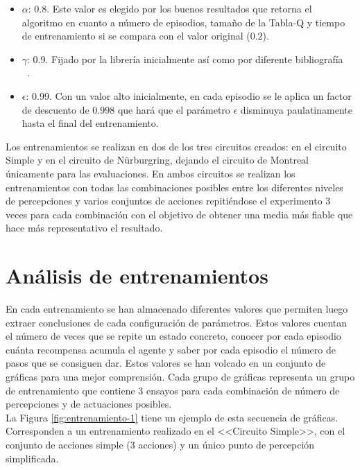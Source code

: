 \begin{itemize}
    \item \textbf{$\alpha$}: 0.8. Este valor es elegido por los buenos resultados que retorna el algoritmo en cuanto a número de episodios, tamaño de la Tabla-Q y tiempo de entrenamiento si se compara con el valor original ($0.2$).
    \item \textbf{$\gamma$}: 0.9. Fijado por la librería inicialmente así como por diferente bibliografía~\cite{oreily} ~\cite{pytorch_drl}.
    \item \textbf{$\epsilon$}: 0.99. Con un valor alto inicialmente, en cada episodio se le aplica un factor de descuento de $0.998$ que hará que el parámetro $\epsilon$ disminuya paulatinamente hasta el final del entrenamiento.\\
\end{itemize} 

Los entrenamientos se realizan en dos de los tres circuitos creados: en el circuito Simple y en el circuito de Nürburgring, dejando el circuito de Montreal únicamente para las evaluaciones. En ambos circuitos se realizan los entrenamientos con todas las combinaciones posibles entre los diferentes niveles de percepciones y varios conjuntos de acciones repitiéndose el experimento 3 veces para cada combinación con el objetivo de obtener una media más fiable que hace más representativo el resultado.\\

\section{Análisis de entrenamientos}

En cada entrenamiento se han almacenado diferentes valores que permiten luego extraer conclusiones de cada configuración de parámetros. Estos valores cuentan el número de veces que se repite un estado concreto, conocer por cada episodio cuánta recompensa acumula el agente y saber por cada episodio el número de pasos que se consiguen dar. Estos valores se han volcado en un conjunto de gráficas para una mejor comprensión. Cada grupo de gráficas representa un grupo de entrenamiento que contiene 3 ensayos para cada combinación de número de percepciones y de actuaciones posibles.\\

La Figura \ref{fig:entrenamiento-1} tiene un ejemplo de esta secuencia de gráficas. Corresponden a un entrenamiento realizado en el <<Circuito Simple>>, con el conjunto de acciones simple (3 acciones) y un único punto de percepción simplificada.\\


